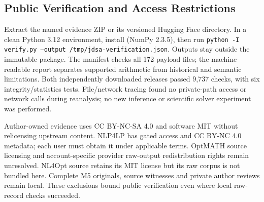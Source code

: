 \subsection{Public Verification and Access Restrictions}
Extract the named evidence ZIP or its versioned Hugging Face directory. In a clean Python 3.12 environment, install  (NumPy 2.3.5), then run \texttt{python -I verify.py --output /tmp/jdsa-verification.json}. Outputs stay outside the immutable package. The manifest checks all 172 payload files; the machine-readable report separates supported arithmetic from historical and semantic limitations. Both independently downloaded releases passed 9,737 checks, with six integrity/statistics tests. File/network tracing found no private-path access or network calls during reanalysis; no new inference or scientific solver experiment was performed.

Author-owned evidence uses CC BY-NC-SA 4.0 and software MIT without relicensing upstream content. NLP4LP has gated access and CC BY-NC 4.0 metadata; each user must obtain it under applicable terms. OptMATH source licensing and account-specific provider raw-output redistribution rights remain unresolved. NL4Opt source retains its MIT license but its raw corpus is not bundled here. Complete M5 originals, source witnesses and private author reviews remain local. These exclusions bound public verification even where local raw-record checks succeeded.
